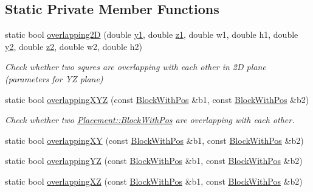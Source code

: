 \subsection*{Static Private Member Functions}
\begin{DoxyCompactItemize}
\item 
static bool \hyperlink{classPlacement_a9d95d0c91c23c7c8d627a81ed03ffa13}{overlapping2\+D} (double \hyperlink{classPlacement_a4c17ed499418886700bf8e4d4ee45047}{y1}, double \hyperlink{classPlacement_a3e9d90f2d85b6641d2fd7d74d2600394}{z1}, double w1, double h1, double \hyperlink{classPlacement_ae7b89409ab130ba3d7c268faf7175b40}{y2}, double \hyperlink{classPlacement_aed710205286315a2a14f8cc2ceacd267}{z2}, double w2, double h2)
\begin{DoxyCompactList}\small\item\em Check whether two squres are overlapping with each other in 2\+D plane (parameters for Y\+Z plane) \end{DoxyCompactList}\item 
static bool \hyperlink{classPlacement_aedd3513c4fc7a9cccd83144c65c83c00}{overlapping\+X\+Y\+Z} (const \hyperlink{structPlacement_1_1BlockWithPos}{Block\+With\+Pos} \&b1, const \hyperlink{structPlacement_1_1BlockWithPos}{Block\+With\+Pos} \&b2)
\begin{DoxyCompactList}\small\item\em Check whether two \hyperlink{structPlacement_1_1BlockWithPos}{Placement\+::\+Block\+With\+Pos} are overlapping with each other. \end{DoxyCompactList}\item 
static bool \hyperlink{classPlacement_ab87e46b2e8e64fd0be0c07b74651cd82}{overlapping\+X\+Y} (const \hyperlink{structPlacement_1_1BlockWithPos}{Block\+With\+Pos} \&b1, const \hyperlink{structPlacement_1_1BlockWithPos}{Block\+With\+Pos} \&b2)
\item 
static bool \hyperlink{classPlacement_a2f0b907f20632d98c1169e7c3ad427db}{overlapping\+Y\+Z} (const \hyperlink{structPlacement_1_1BlockWithPos}{Block\+With\+Pos} \&b1, const \hyperlink{structPlacement_1_1BlockWithPos}{Block\+With\+Pos} \&b2)
\item 
static bool \hyperlink{classPlacement_af6823b9b781ae186e922774bb4623b17}{overlapping\+X\+Z} (const \hyperlink{structPlacement_1_1BlockWithPos}{Block\+With\+Pos} \&b1, const \hyperlink{structPlacement_1_1BlockWithPos}{Block\+With\+Pos} \&b2)
\end{DoxyCompactItemize}
